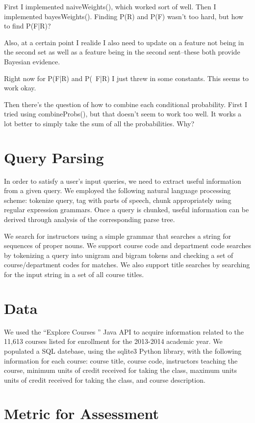 \documentclass[12pt]{article}
\begin{document}
First I implemented naiveWeights(), which worked sort of well. Then I implemented bayesWeights(). Finding P(R) and P(F) wasn't too hard, but how to find P(F|R)?

Also, at a certain point I realide I also need to update on a feature not being in the second set as well as a feature being in the second sent--these both provide Bayesian evidence.

Right now for P(F|R) and P(~F|R) I just threw in some constants. This seems to work okay.

Then there's the question of how to combine each conditional probability. First I tried using combineProbs(), but that doesn't seem to work too well. It works a lot better to simply take the sum of all the probabilities. Why?

\section*{Query Parsing}
In order to satisfy a user's input queries, we need to extract useful information from a given query. We employed the following natural language processing scheme: tokenize query, tag with parts of speech, chunk appropriately using regular expression grammars. Once a query is chunked, useful information can be derived through analysis of the corresponding parse tree. 

We search for instructors using a simple grammar that searches a string for sequences of proper nouns. We support course code and department code searches by tokenizing a query into unigram and bigram tokens and checking a set of course/department codes for matches. We also support title searches by searching for the input string in a set of all course titles.

\section*{Data}
	 We used the ``Explore Courses '' Java API to acquire information related to the 11,613 courses listed for enrollment for the 2013-2014 academic year. We populated a SQL datebase, using the sqlite3 Python library, with the following information for each course: course title, course code, instructors teaching the course, minimum units of credit received for taking the class, maximum units units of credit received for taking the class, and course description. 

\section*{Metric for Assessment}
\end{document}
